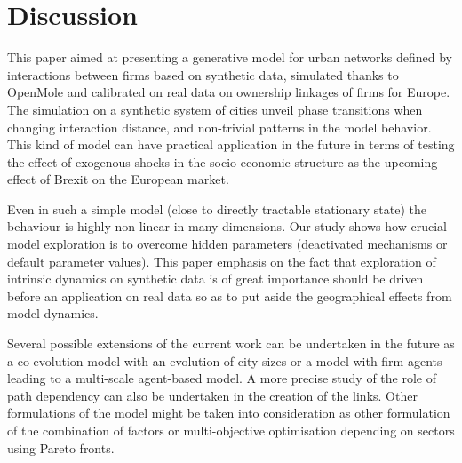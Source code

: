 \documentclass[11pt]{article}
\begin{document}
\section{Discussion}

This paper aimed at presenting a generative model for urban networks defined by interactions between firms based on synthetic data, simulated thanks to OpenMole and calibrated on real data on ownership linkages of firms for Europe. The simulation on a synthetic system of cities unveil phase transitions when changing interaction distance, and non-trivial patterns in the model behavior. This kind of model can have practical application in the future in terms of testing the effect of exogenous shocks in the socio-economic structure as the upcoming effect of Brexit on the European market.

Even in such a simple model (close to directly tractable stationary state) the behaviour is highly non-linear in many dimensions. Our study shows how crucial model exploration is to overcome hidden parameters (deactivated mechanisms or default parameter values). This paper emphasis on the fact that exploration of intrinsic dynamics on synthetic data is of great importance should be driven before an application on real data so as to put aside the geographical effects from model dynamics.

Several possible extensions of the current work can be undertaken in the future as a co-evolution model with an evolution of city sizes or a model with firm agents leading to a multi-scale agent-based model. A more precise study of the role of path dependency can also be undertaken in the creation of the links. Other formulations of the model might be taken into consideration as other formulation of the combination of factors or multi-objective optimisation depending on sectors using Pareto fronts.  





%

\end{document}
